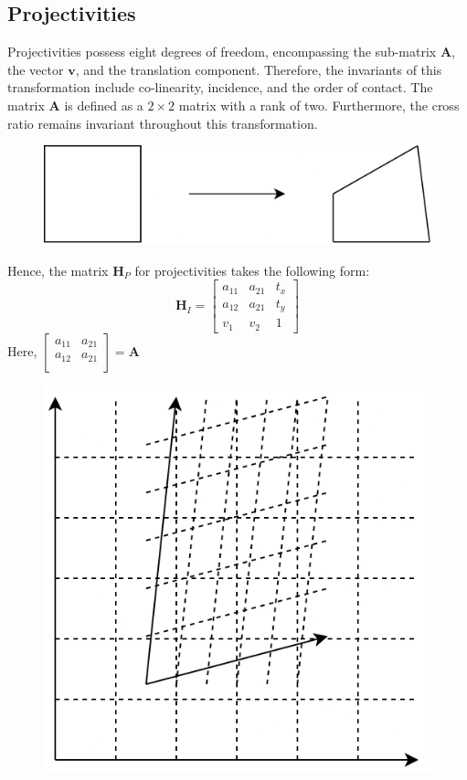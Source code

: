 \subsection{Projectivities}
Projectivities possess eight degrees of freedom, encompassing the sub-matrix $\mathbf{A}$, the vector $\mathbf{v}$, and the translation component. 
Therefore, the invariants of this transformation include co-linearity, incidence, and the order of contact.
The matrix $\mathbf{A}$ is defined as a $2 \times 2$ matrix with a rank of two. 
Furthermore, the cross ratio remains invariant throughout this transformation.
\begin{figure}[H]
    \centering
    \includegraphics[width=0.25\linewidth]{images/projectivities.png}
\end{figure}
Hence, the matrix $\mathbf{H}_P$ for projectivities takes the following form:
\[\mathbf{H}_I=
\begin{bmatrix}
    a_{11} & a_{21} & t_x \\
    a_{12} & a_{21} & t_y \\
    v_1 & v_2 & 1
\end{bmatrix}\]
Here, $
\begin{bmatrix}
    a_{11} & a_{21} \\
    a_{12} & a_{21} \\
\end{bmatrix}
=\mathbf{A}$
\begin{figure}[H]
    \centering
    \includegraphics[width=0.25\linewidth]{images/projectivities1.png}
\end{figure}